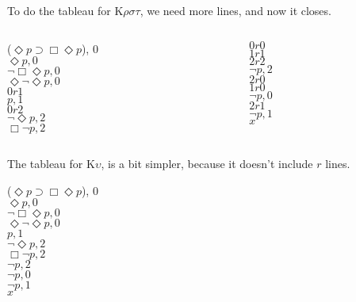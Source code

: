 \documentclass[
  14pt,
  letterpaper,
  ignorenonframetext,
]{beamer}
\begin{document}
\begin{frame}
To do the tableau for K\(\rho \sigma \tau\), we need more lines, and now
it closes.

\begin{columns}[T]
\begin{column}{0.48\textwidth}
\begin{center}
\neg($\Diamond p \supset \Box \Diamond p$), 0 \\
$\Diamond p, 0$ \\
$\neg \Box \Diamond p, 0$ \\
$\Diamond \neg \Diamond p, 0$ \\
$0r1$ \\
$p, 1$ \\
$0r2$ \\
$\neg \Diamond p, 2$ \\
$\Box \neg p, 2$
\end{center}
\end{column}

\begin{column}{0.48\textwidth}
\begin{center}
$0r0$ \\
$1r1$ \\
$2r2$ \\
$\neg p, 2$ \\
$2r0$ \\
$1r0$ \\
$\neg p, 0$ \\
$2r1$ \\
$\neg p, 1$ \\
$x$
\end{center}
\end{column}
\end{columns}
\end{frame}

\begin{frame}
The tableau for K\(\upsilon\), is a bit simpler, because it doesn't
include \(r\) lines.

\begin{center}
\neg($\Diamond p \supset \Box \Diamond p$), 0 \\
$\Diamond p, 0$ \\
$\neg \Box \Diamond p, 0$ \\
$\Diamond \neg \Diamond p, 0$ \\
$p, 1$ \\
$\neg \Diamond p, 2$ \\
$\Box \neg p, 2$ \\
$\neg p, 2$ \\
$\neg p, 0$ \\
$\neg p, 1$ \\
$x$
\end{center}
\end{frame}
\end{document}
